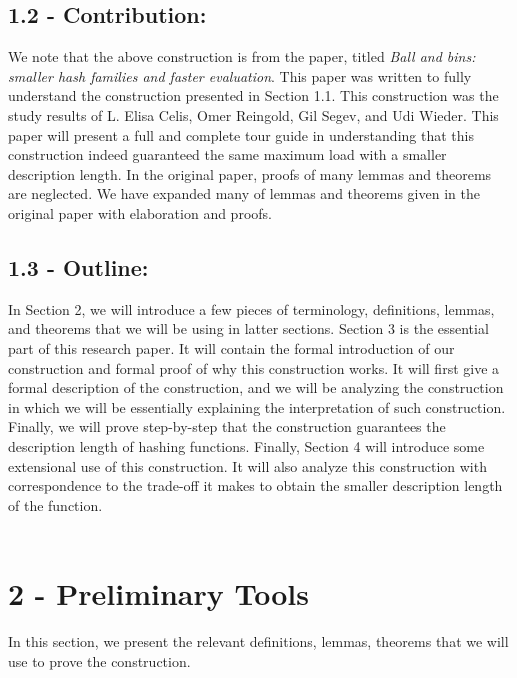 \documentclass[letterpaper]{article} %
\begin{document}
	\subsection{1.2 - Contribution:} 
	We note that the above construction is from the paper, titled \textit{Ball and bins: smaller hash families and faster evaluation}. This paper was written to fully understand the construction presented in Section 1.1. This construction was the study results of L. Elisa Celis, Omer Reingold, Gil Segev, and Udi Wieder. This paper will present a full and complete tour guide in understanding that this construction indeed guaranteed the same maximum load with a smaller description length. In the original paper, proofs of many lemmas and theorems are neglected. We have expanded many of lemmas and theorems given in the original paper with elaboration and proofs. \\
		
	\subsection{1.3 - Outline:} 
	In Section 2, we will introduce a few pieces of terminology, definitions, lemmas, and theorems that we will be using in latter sections. Section 3 is the essential part of this research paper. It will contain the formal introduction of our construction and formal proof of why this construction works. It will first give a formal description of the construction, and we will be analyzing the construction in which we will be essentially explaining the interpretation of such construction. Finally, we will prove step-by-step that the construction guarantees the description length of hashing functions. Finally, Section 4 will introduce some extensional use of this construction. It will also analyze this construction with correspondence to the trade-off it makes to obtain the smaller description length of the function. \\\\
	
	\section{2 - Preliminary Tools}
	In this section, we present the relevant definitions, lemmas, theorems that we will use to prove the construction.  \\
	
\end{document}
